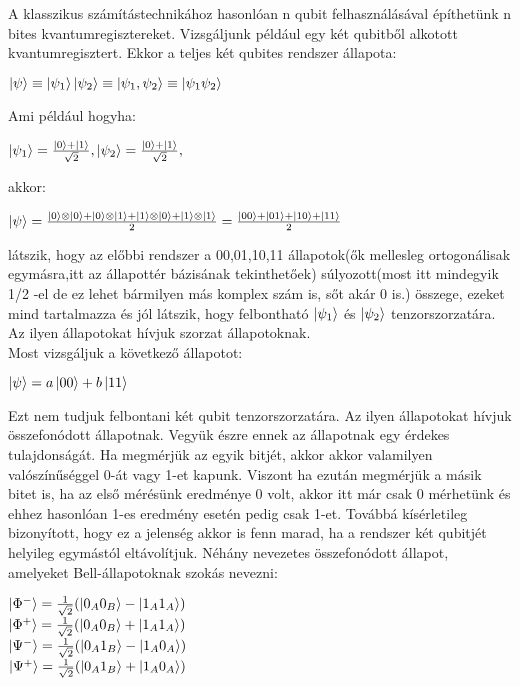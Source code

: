 A klasszikus számítástechnikához hasonlóan n qubit felhasználásával építhetünk n bites kvantumregisztereket. Vizsgáljunk például egy két qubitből alkotott kvantumregisztert. Ekkor a teljes két qubites rendszer állapota:
\begin{center}
$ \ket{\psi} \equiv \ket{\psi_1}\ket{\psi_2} \equiv \ket{\psi_1,\psi_2} \equiv \ket{\psi_1\psi_2} $
\end{center}
Ami például hogyha:
\begin{center}
$ \ket{\psi_1} = \frac{\ket{0}+\ket{1}}{\sqrt{2}}, \ket{\psi_2}=\frac{\ket{0}+\ket{1}}{\sqrt{2}}, $
\end{center}
akkor:
\begin{center}
$ \ket{\psi}= \frac{\ket{0} \otimes \ket{0} +\ket{0}\otimes\ket{1}+\ket{1}\otimes\ket{0}+\ket{1}\otimes\ket{1}  }{2} = \frac{\ket{00}+\ket{01}+\ket{10}+\ket{11}}{2} $
\end{center}
látszik, hogy az előbbi rendszer a 00,01,10,11 állapotok(ők mellesleg ortogonálisak egymásra,itt az állapottér bázisának tekinthetőek) súlyozott(most itt mindegyik 1/2 -el de ez lehet bármilyen más komplex szám is, sőt akár 0 is.) összege, ezeket mind tartalmazza és jól látszik, hogy felbontható $\ket{\psi_1}$  és  $\ket{\psi_2}$  tenzorszorzatára. Az ilyen állapotokat hívjuk szorzat állapotoknak.\\
Most vizsgáljuk a következő állapotot:
\begin{center}
$ \ket{\psi} = a\ket{00}+b\ket{11} $
\end{center}
Ezt nem tudjuk felbontani két qubit tenzorszorzatára. Az ilyen állapotokat hívjuk összefonódott állapotnak. Vegyük észre ennek az állapotnak egy érdekes tulajdonságát. Ha megmérjük az egyik bitjét, akkor akkor valamilyen valószínűséggel 0-át vagy 1-et kapunk. Viszont ha ezután megmérjük a másik bitet is, ha az első mérésünk eredménye 0 volt, akkor itt már csak 0 mérhetünk és ehhez hasonlóan 1-es eredmény esetén pedig csak 1-et. Továbbá kísérletileg bizonyított, hogy ez a jelenség akkor is fenn marad, ha a rendszer két qubitjét helyileg egymástól eltávolítjuk.
Néhány nevezetes összefonódott állapot, amelyeket Bell-állapotoknak szokás nevezni:
\begin{center}
$ \ket{\Phi^-}= \frac{1}{\sqrt{2}}(\ket{0_A0_B}-\ket{1_A1_A}) $ \\
$ \ket{\Phi^+}= \frac{1}{\sqrt{2}}(\ket{0_A0_B}+\ket{1_A1_A}) $ \\
$ \ket{\Psi^-}= \frac{1}{\sqrt{2}}(\ket{0_A1_B}-\ket{1_A0_A}) $ \\
$ \ket{\Psi^+}= \frac{1}{\sqrt{2}}(\ket{0_A1_B}+\ket{1_A0_A}) $ \\

\end{center}

